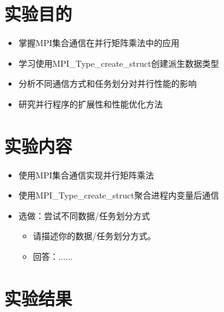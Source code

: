 \documentclass{SYSUReport}
\date{2025年4月2日}
\begin{document}
\cover
\thispagestyle{empty} %
\clearpage



\section{实验目的}
\begin{itemize}
    \item 掌握MPI集合通信在并行矩阵乘法中的应用
    \item 学习使用MPI\_Type\_create\_struct创建派生数据类型
    \item 分析不同通信方式和任务划分对并行性能的影响
    \item 研究并行程序的扩展性和性能优化方法
\end{itemize}

\section{实验内容}
\begin{itemize}
    \item 使用MPI集合通信实现并行矩阵乘法
    \item 使用MPI\_Type\_create\_struct聚合进程内变量后通信
    \item 选做：尝试不同数据/任务划分方式
    \begin{itemize}
        \item 请描述你的数据/任务划分方式。
        \item 回答：......
    \end{itemize}
\end{itemize}


\section{实验结果}
\end{document}

